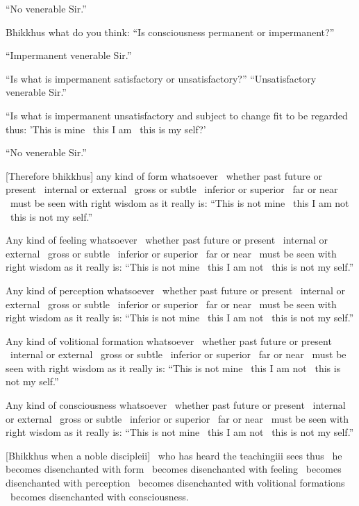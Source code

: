 “No venerable Sir.”

Bhikkhus what do you think: “Is consciousness permanent or impermanent?”

“Impermanent venerable Sir.”

“Is what is impermanent satisfactory or unsatisfactory?” “Unsatisfactory venerable Sir.”

“Is what is impermanent unsatisfactory and subject to change fit to be regarded thus: 'This is mine \breathmark\ this I am \breathmark\ this is my self?'

“No venerable Sir.”

[Therefore bhikkhus] any kind of form whatsoever \breathmark\ whether past future or present \breathmark\ internal or external \breathmark\ gross or subtle \breathmark\ inferior or superior \breathmark\ far or near \breathmark\ must be seen with right wisdom as it really is: “This is not mine \breathmark\ this I am not \breathmark\ this is not my self.”

Any kind of feeling whatsoever \breathmark\ whether past future or present \breathmark\ internal or external \breathmark\ gross or subtle \breathmark\ inferior or superior \breathmark\ far or near \breathmark\ must be seen with right wisdom as it really is: “This is not mine \breathmark\ this I am not \breathmark\ this is not my self.”

Any kind of perception whatsoever \breathmark\ whether past future or present \breathmark\ internal or external \breathmark\ gross or subtle \breathmark\ inferior or superior \breathmark\ far or near \breathmark\ must be seen with right wisdom as it really is: “This is not mine \breathmark\ this I am not \breathmark\ this is not my self.”

Any kind of volitional formation whatsoever \breathmark\ whether past future or present \breathmark\ internal or external \breathmark\ gross or subtle \breathmark\ inferior or superior \breathmark\ far or near \breathmark\ must be seen with right wisdom as it really is: “This is not mine \breathmark\ this I am not \breathmark\ this is not my self.”

Any kind of consciousness whatsoever \breathmark\ whether past future or present \breathmark\ internal or external \breathmark\ gross or subtle \breathmark\ inferior or superior \breathmark\ far or near \breathmark\ must be seen with right wisdom as it really is: “This is not mine \breathmark\ this I am not \breathmark\ this is not my self.”

[Bhikkhus when a noble discipleii] \breathmark\ who has heard the teachingiii sees thus \breathmark\ he becomes disenchanted with form \breathmark\ becomes disenchanted with feeling \breathmark\ becomes disenchanted with perception \breathmark\ becomes disenchanted with volitional formations \breathmark\ becomes disenchanted with consciousness.


